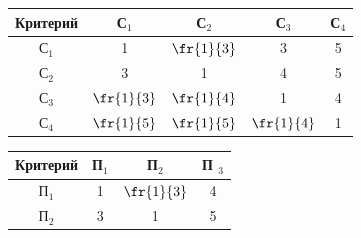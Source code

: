 \begin{table}
\begin{minipage}[b]{64mm}
\begin{center}
{}



      \vspace*{2ex}

      

     \tabcolsep=9.1pt

      \begin{tabular}{|c|c|c|c|c|}

      \hline

Критерий&С$_1$&С$_2$&С$_3$&С$_4$\\

\hline

С$_1$&1&$\fr{1}{3}$&3&5\\

С$_2$&3&1&4&5\\

С$_3$&$\fr{1}{3}$&$\fr{1}{4}$&1&4\\

С$_4$&$\fr{1}{5}$&$\fr{1}{5}$&$\fr{1}{4}$&1\\

\hline

\end{tabular}






{

}

\vspace*{2ex}



\tabcolsep=11.8pt

\begin{tabular}{|c|c|c|c|}

\hline

Критерий&П$_1$&П$_2$&П $_3$\\

\hline

П$_1$&1&$\fr{1}{3}$&4\\

П$_2$&3&1&5\\


\end{tabular}
\end{center}
\end{minipage}
\end{table}
